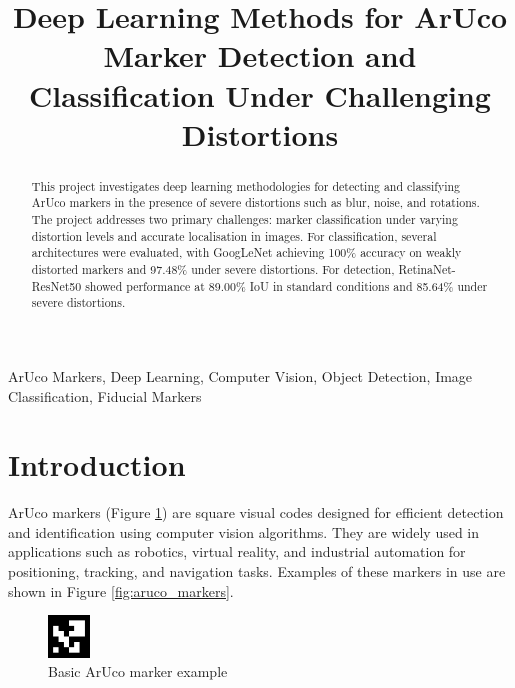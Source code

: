 \documentclass[conference]{IEEEtran}
\begin{document}
\title{Deep Learning Methods for ArUco Marker Detection and Classification Under Challenging Distortions}

\author{
}

\maketitle
\begin{abstract}

This project investigates deep learning methodologies for detecting and classifying ArUco markers in the presence of severe distortions such as blur,
noise, and rotations. The project addresses two primary challenges: marker classification under varying distortion levels and accurate localisation in
images. For classification, several architectures were evaluated, with GoogLeNet achieving 100\% accuracy on weakly distorted markers and
97.48\% under severe distortions. For detection, RetinaNet-ResNet50 showed performance at 89.00\% IoU in standard conditions and 85.64\%
under severe distortions.

\end{abstract}

\begin{IEEEkeywords}
ArUco Markers, Deep Learning, Computer Vision, Object Detection, Image Classification, Fiducial Markers
\end{IEEEkeywords}

\section{Introduction}

ArUco markers (Figure \ref{fig:aruco_marker_basic}) are square visual codes designed for efficient detection and identification
using computer vision algorithms. They are widely used in applications such as robotics, virtual reality, and industrial automation
for positioning, tracking, and navigation tasks. Examples of these markers in use are shown in Figure \ref{fig:aruco_markers}.

\begin{figure}[h]
    \centering
    \includegraphics[width=0.1\textwidth]{images/aruco-marker-1.png}
    \caption{Basic ArUco marker example}
    \label{fig:aruco_marker_basic}
\end{figure}
\end{document}
